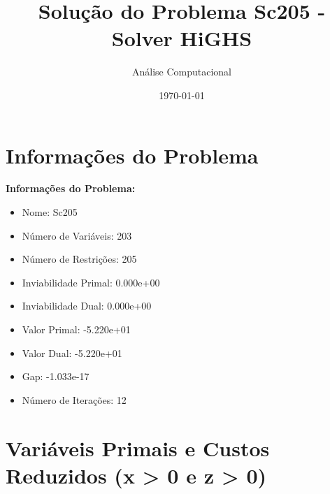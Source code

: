\documentclass[12pt]{article}
\title{Solução do Problema Sc205 - Solver HiGHS}
\author{Análise Computacional}
\date{\today}
\begin{document}
\maketitle

\section{Informações do Problema}

\textbf{Informações do Problema:}
\begin{itemize}
\item Nome: Sc205
\item Número de Variáveis: 203
\item Número de Restrições: 205
\item Inviabilidade Primal: 0.000e+00
\item Inviabilidade Dual: 0.000e+00
\item Valor Primal: -5.220e+01
\item Valor Dual: -5.220e+01
\item Gap: -1.033e-17
\item Número de Iterações: 12
\end{itemize}


\section{Variáveis Primais e Custos Reduzidos (x > 0 e z > 0)}
\end{document}
